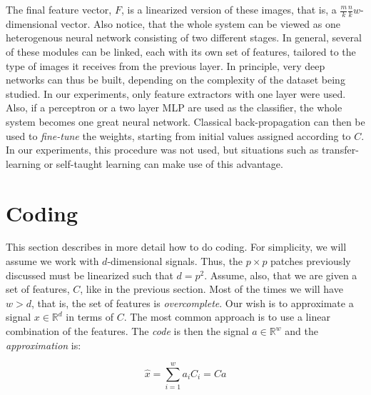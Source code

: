 \documentclass[runningheads,a4paper]{llncs}
\newcommand{\hctimes}[2]{{#1}\!\times\!{#2}}
\newcommand{\hcsignalspace}{\mathbb{R}^d}
\newcommand{\hcweightspace}{\mathbb{R}^w}
\begin{document}
The final feature vector, $F$, is a linearized version of these images, that is, a $\frac{m}{k}\frac{n}{k}w$-dimensional vector. Also notice, that the whole system can be viewed as one heterogenous neural network consisting of two different stages. In general, several of these modules can be linked, each with its own set of features, tailored to the type of images it receives from the previous layer. In principle, very deep networks can thus be built, depending on the complexity of the dataset being studied. In our experiments, only feature extractors with one layer were used. Also, if a perceptron or a two layer MLP are used as the classifier, the whole system becomes one great neural network. Classical back-propagation can then be used to \emph{fine-tune} the weights, starting from initial values assigned according to $C$. In our experiments, this procedure was not used, but situations such as transfer-learning or self-taught learning \cite{self-taught-learning} can make use of this advantage.

\section{Coding}

This section describes in more detail how to do coding. For simplicity, we will assume we work with $d$-dimensional signals. Thus, the $\hctimes{p}{p}$ patches previously discussed must be linearized such that $d = p^2$. Assume, also, that we are given a set of features, $C$, like in the previous section. Most of the times we will have $w > d$, that is, the set of features is \emph{overcomplete}. Our wish is to approximate a signal $x \in \hcsignalspace$ in terms of $C$. The most common approach is to use a linear combination of the features. The \emph{code} is then the signal $a \in \hcweightspace$ and the \emph{approximation} is:

\begin{equation*}
\hat{x} = \sum_{i=1}^w {a_i C_i} = Ca
\end{equation*}
\end{document}
